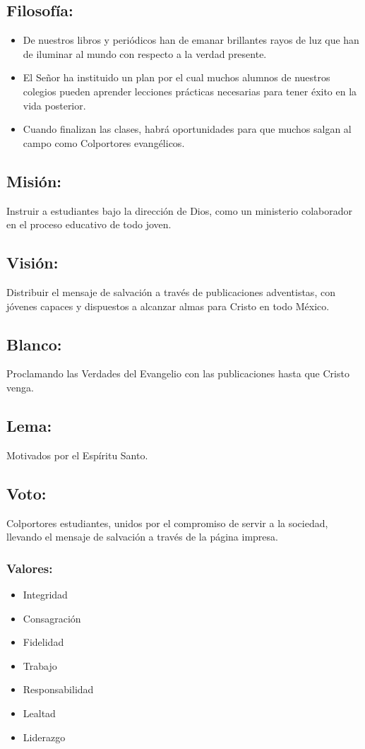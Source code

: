 \documentclass[runningheads]{llncs}
\begin{document}
\subsection*{Filosofía:}
\begin{itemize}
    \item De nuestros libros y periódicos han de emanar brillantes rayos de luz que han de iluminar al mundo con respecto a la verdad presente.
    \item El Señor ha instituido un plan por el cual muchos alumnos de nuestros colegios pueden aprender lecciones prácticas necesarias para tener éxito en la vida posterior.
    \item Cuando finalizan las clases, habrá oportunidades para que muchos salgan al campo como Colportores evangélicos.
\end{itemize}
\subsection*{Misión: }
Instruir a estudiantes bajo la dirección de Dios, como un ministerio colaborador en el proceso educativo de todo joven.
\subsection*{Visión: }
Distribuir el mensaje de salvación a través de publicaciones adventistas, con jóvenes capaces y dispuestos a alcanzar almas para Cristo en todo México.
\subsection*{Blanco: }
Proclamando las Verdades del Evangelio con las publicaciones hasta que Cristo venga.
\subsection*{Lema: }
Motivados por el Espíritu Santo.
\subsection*{Voto:} 
Colportores estudiantes, unidos por el compromiso de servir a la sociedad, llevando el mensaje de salvación a través de la página impresa.
\subsubsection*{Valores: }
\begin{itemize}
    \item Integridad
    \item Consagración
    \item Fidelidad
    \item Trabajo
    \item Responsabilidad
    \item Lealtad
    \item Liderazgo
\end{itemize}
\end{document}
